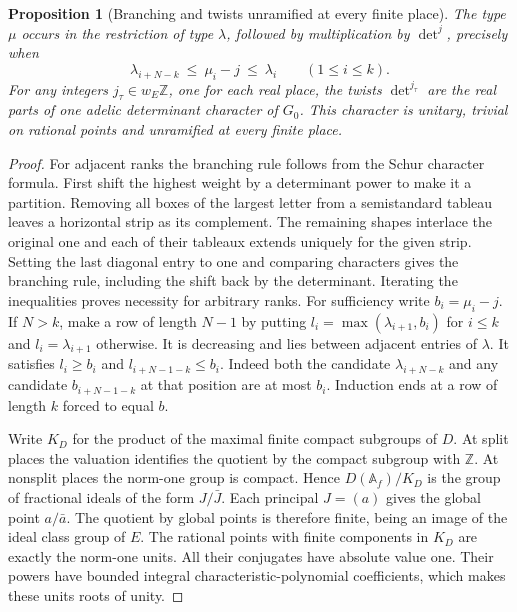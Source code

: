 \documentclass[a4paper,11pt]{article}
\newtheorem{proposition}{Proposition}[section]
\theoremstyle{definition}
\theoremstyle{remark}
\numberwithin{equation}{section}
\begin{document}
\begin{proposition}[Branching and twists unramified at every finite place]\leavevmode
\label{prop:branch275}
The type \(\mu\) occurs in the restriction of type \(\lambda\),
followed by multiplication by \(\det^j\), precisely when
\[
       \lambda_{i+N-k}\ \le\ \mu_i-j\ \le\ \lambda_i
                               \qquad(1\le i\le k).
\]
For any integers \(j_\tau\in w_E\mathbb Z\), one for each
real place, the twists \(\det^{j_\tau}\) are the real parts
of one adelic determinant character of \(G_0\). This
character is unitary, trivial on rational points and
unramified at every finite place.
\end{proposition}
\begin{proof}
For adjacent ranks the branching rule follows from the Schur
character formula. First shift the highest weight by a
determinant power to make it a partition. Removing all boxes
of the largest letter from a semistandard tableau leaves a
horizontal strip as its complement. The remaining shapes
interlace the original one and each of their tableaux extends
uniquely for the given strip. Setting the last diagonal
entry to one and comparing characters gives the branching
rule, including the shift back by the determinant.
Iterating the inequalities proves necessity for arbitrary
ranks. For sufficiency write \(b_i=\mu_i-j\). If \(N>k\),
make a row of length \(N-1\) by putting
\(l_i=\max(\lambda_{i+1},b_i)\) for \(i\le k\) and
\(l_i=\lambda_{i+1}\) otherwise. It is decreasing and lies
between adjacent entries of \(\lambda\). It satisfies
\(l_i\ge b_i\) and \(l_{i+N-1-k}\le b_i\). Indeed both the
candidate \(\lambda_{i+N-k}\) and any candidate
\(b_{i+N-1-k}\) at that position are at most \(b_i\).
Induction ends at a row of length \(k\) forced to equal \(b\).

Write \(K_D\) for the product of the maximal finite compact
subgroups of \(D\). At split places the valuation identifies
the quotient by the compact subgroup with \(\mathbb Z\).
At nonsplit places the norm-one group is compact. Hence
\(D(\mathbb A_f)/K_D\) is the group of fractional ideals
of the form \(J/\bar J\). Each principal \(J=(a)\) gives
the global point \(a/\bar a\). The quotient by global
points is therefore finite, being an image of the ideal
class group of \(E\). The rational points with finite
components in \(K_D\) are exactly the norm-one units.
All their conjugates have absolute value one. Their powers
have bounded integral characteristic-polynomial coefficients,
which makes these units roots of unity.


\end{proof}
\end{document}
